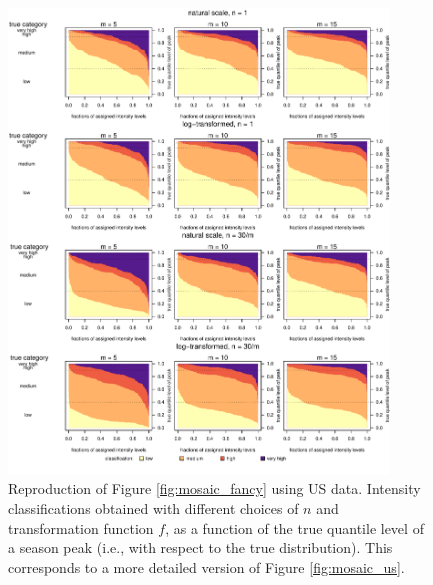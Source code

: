 \documentclass{article}
\begin{document}
\begin{figure}[h!]
\includegraphics[width=0.9\textwidth]{figure/mosaic_fr_fancy.pdf}
\caption{Reproduction of Figure \ref{fig:mosaic_fancy} using US data. Intensity classifications obtained with different choices of $n$ and transformation function $f$, as a function of the true quantile level of a season peak (i.e., with respect to the true distribution). This corresponds to a more detailed version of Figure \ref{fig:mosaic_us}.}
\label{fig:mosaic_fancy_us}
\end{figure}

\newpage
\end{document}
